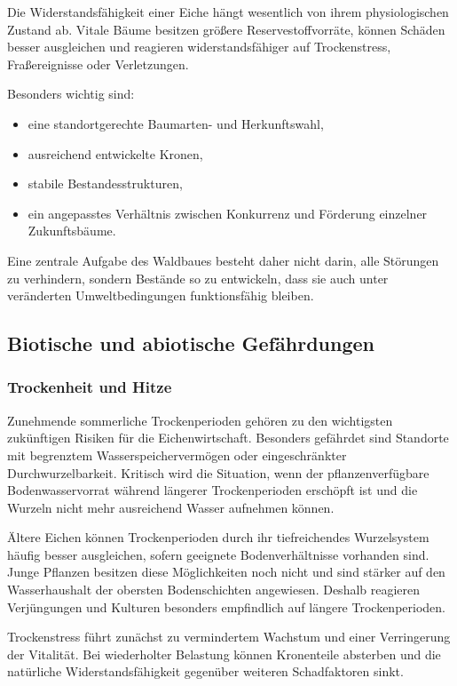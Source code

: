 \documentclass[twocolumn, bibliography=totoc, abstract=true]{scrartcl}
\begin{document}
Die Widerstandsfähigkeit einer Eiche hängt wesentlich von ihrem physiologischen Zustand ab. Vitale Bäume besitzen größere Reservestoffvorräte, können Schäden besser ausgleichen und reagieren widerstandsfähiger auf Trockenstress, Fraßereignisse oder Verletzungen.

Besonders wichtig sind:

\begin{itemize}
\item eine standortgerechte Baumarten- und Herkunftswahl,
\item ausreichend entwickelte Kronen,
\item stabile Bestandesstrukturen,
\item ein angepasstes Verhältnis zwischen Konkurrenz und Förderung einzelner Zukunftsbäume.
\end{itemize}

Eine zentrale Aufgabe des Waldbaues besteht daher nicht darin, alle Störungen zu verhindern, sondern Bestände so zu entwickeln, dass sie auch unter veränderten Umweltbedingungen funktionsfähig bleiben.

\subsection{Biotische und abiotische Gefährdungen}

\subsubsection{Trockenheit und Hitze}

Zunehmende sommerliche Trockenperioden gehören zu den wichtigsten zukünftigen Risiken für die Eichenwirtschaft. Besonders gefährdet sind Standorte mit begrenztem Wasserspeichervermögen oder eingeschränkter Durchwurzelbarkeit. Kritisch wird die Situation, wenn der pflanzenverfügbare Bodenwasservorrat während längerer Trockenperioden erschöpft ist und die Wurzeln nicht mehr ausreichend Wasser aufnehmen können.

Ältere Eichen können Trockenperioden durch ihr tiefreichendes Wurzelsystem häufig besser ausgleichen, sofern geeignete Bodenverhältnisse vorhanden sind. Junge Pflanzen besitzen diese Möglichkeiten noch nicht und sind stärker auf den Wasserhaushalt der obersten Bodenschichten angewiesen. Deshalb reagieren Verjüngungen und Kulturen besonders empfindlich auf längere Trockenperioden.

Trockenstress führt zunächst zu vermindertem Wachstum und einer Verringerung der Vitalität. Bei wiederholter Belastung können Kronenteile absterben und die natürliche Widerstandsfähigkeit gegenüber weiteren Schadfaktoren sinkt.
\end{document}
